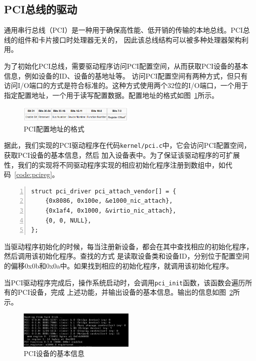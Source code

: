 \documentclass[a4paper,twoside]{ctexrep}
\begin{document}
\begin{spacing}{1.2}
\subsection{PCI总线的驱动}

通用串行总线（PCI）是一种用于确保高性能、低开销的传输的本地总线。PCI总线的组件和卡片接口时处理器无关的，
因此该总线结构可以被多种处理器架构利用。

为了初始化PCI总线，需要驱动程序访问PCI配置空间，从而获取PCI设备的基本信息，例如设备的ID、设备的基地址等。
访问PCI配置空间有两种方式，但只有访问I/O端口的方式是符合标准的。这种方式使用两个32位的I/O端口，一个用于
指定配置地址，一个用于读写配置数据。配置地址的格式如图~\ref{fig:pci_config_addr}所示。
\begin{figure}[htb]
	\centering
	\caption{PCI配置地址的格式}
	\label{fig:pci_config_addr}
	\includegraphics[width=0.5\textwidth]{controlreg.png}
\end{figure}
据此，我们实现的PCI驱动程序在代码\texttt{kernel/pci.c}中，它会访问PCI配置空间，获取PCI设备的基本信息，然后
加入设备表中。为了保证该驱动程序的可扩展性，我们的实现将不同驱动程序实现的相应初始化程序注册到数组中，如代码~\ref{code:pcireg}。
\begin{lstlisting}[numbers=left,style=CppStyle,caption={PCI驱动程序的初始化程序注册},label={code:pcireg}]
struct pci_driver pci_attach_vendor[] = {
	{0x8086, 0x100e, &e1000_nic_attach},
	{0x1af4, 0x1000, &virtio_nic_attach},
	{0, 0, NULL},
};
\end{lstlisting}
当驱动程序初始化的时候，每当注册新设备，都会在其中查找相应的初始化程序，然后调用该初始化程序。查找的方式
是读取设备类和设备ID，分别位于配置空间的偏移0x0b和0x0a中。如果找到相应的初始化程序，就调用该初始化程序。

当PCI驱动程序完成后，操作系统启动时，会调用\texttt{pci\_init}函数，该函数会遍历所有的PCI设备，完成
上述功能，并输出设备的基本信息。输出的信息如图~\ref{fig:initpci}所示。
\begin{figure}[htb]
	\centering
	\caption{PCI设备的基本信息}
	\label{fig:initpci}
	\includegraphics[width=0.5\textwidth]{initpci.png}
\end{figure}



\end{spacing}
\end{document}

